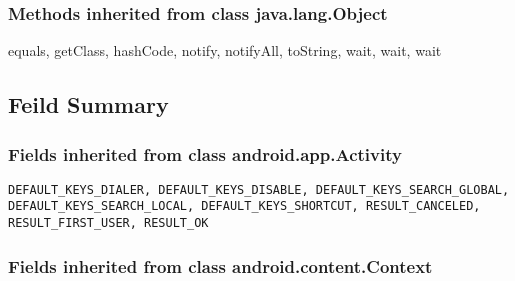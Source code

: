 \subsubsection{Methods inherited from class java.lang.Object}

equals, getClass, hashCode, notify, notifyAll, toString, wait, wait, wait\\



\subsection{Feild Summary}

\subsubsection{Fields inherited from class android.app.Activity}
\begin{lstlisting}
DEFAULT_KEYS_DIALER, DEFAULT_KEYS_DISABLE, DEFAULT_KEYS_SEARCH_GLOBAL, DEFAULT_KEYS_SEARCH_LOCAL, DEFAULT_KEYS_SHORTCUT, RESULT_CANCELED, RESULT_FIRST_USER, RESULT_OK
\end{lstlisting}

\subsubsection{Fields inherited from class android.content.Context}

